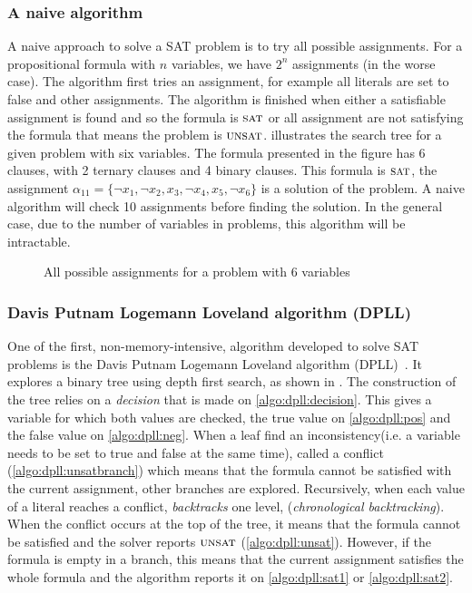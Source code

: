\subsubsection{A naive algorithm}



A naive approach to solve a SAT problem is to try all possible assignments.
For a propositional formula with $n$ variables, we have $2^n$ assignments (in the worse case).  
The algorithm first tries an assignment, for example all literals are set to false and other 
assignments. The algorithm is finished when either  a satisfiable assignment is found and so
the formula is $\textsc{sat}$  or all assignment are not satisfying the formula that means the problem is $\textsc{unsat}$.
 illustrates the search tree for a given problem with six variables.
The  formula presented in the figure has 6 clauses, with 2 ternary clauses and 4 binary clauses.
This formula is $\textsc{sat}$, the assignment
$\alpha_{11} = \{\neg x_1, \neg x_2, x_3, \neg x_4, x_5, \neg x_6 \}$ is a solution of the problem.
A naive algorithm will check 10 assignments before finding the solution. 
In the general case, due to the number of variables in problems, this algorithm will be intractable.
\begin{figure}[!htbp]
 \centering
 
 \caption{All possible assignments for a problem with 6 variables}
 \label{fig:naive_algo}
\end{figure}
\subsubsection{Davis Putnam Logemann Loveland algorithm (DPLL)}\label{sec:dpll}
One of the first, non-memory-intensive, algorithm developed to solve SAT problems is 
the Davis Putnam Logemann Loveland algorithm (DPLL)~\cite{dpll_62}. 
It explores a binary tree using depth first search, as shown in .
The construction of the tree  relies on a \emph{decision} that is made on \cref{algo:dpll:decision}.
This gives a variable for which both values are checked, the true value on \cref{algo:dpll:pos} and the false value on \cref{algo:dpll:neg}.
When a leaf find an inconsistency(i.e. a variable needs to be set to true and false at the same time), called a conflict (\cref{algo:dpll:unsatbranch}) which means that the formula cannot be satisfied with
the current assignment, other branches are explored.
Recursively, when each value of a literal reaches a conflict,
\emph{backtracks} one level, (\emph{chronological backtracking}).
When the conflict occurs at the top of the tree, it means that the formula cannot be satisfied and the 
solver reports $\textsc{unsat}$ (\cref{algo:dpll:unsat}). However, if the formula is empty in a branch, 
this means that the current assignment satisfies the whole formula and the algorithm reports it on \cref{algo:dpll:sat1}
or \ref{algo:dpll:sat2}.

